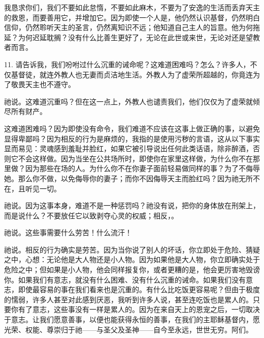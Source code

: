 我恳求你们，我们不要如此怠惰，不要如此麻木，不要为了安逸的生活而丢弃天主的救恩，而要善用它，并增加它。因为即使一个人是，他仍然认识基督，仍然明白信仰，仍然聆听天主的圣言，仍然离知识不远；他知道自己主人的旨意。他为何拖延？为何迟延耽搁？没有什么比善生更好了，无论在此世或来世，无论对还是望教者而言。\par

11. 请告诉我，我们吩咐过什么沉重的诫命呢？这难道困难吗？怎么？许多人，不仅基督徒，就连外教人也无妻而贞洁地生活。外教人为了虚荣所超越的，你竟连为了敬畏天主也不遵守。\par

祂说。这难道沉重吗？但在这一点上，外教人也谴责我们，他们仅仅为了虚荣就倾尽所有财产。\par

这难道困难吗？因为即使没有命令，我们难道不应该在这事上做正确的事，以避免显得卑鄙吗？因为相反的行为是麻烦的，我指的是使用污秽的言语，这从以下事实显而易见：灵魂感到羞耻并脸红，如果它被引导说出任何此类话语，除非醉酒，否则它不会这样做。因为当坐在公共场所时，即使你在家里这样做，为什么你不在那里做？因为那些在场的人。为什么你不在你妻子面前轻易做同样的事？为了不侮辱她。那么你不做，以免侮辱你的妻子；而你不因侮辱天主而脸红吗？因为祂无所不在，且听见一切。\par

祂说。因为这事本身，难道不是一种惩罚吗？祂没有说，把你的身体放在刑架上，而是说什么？不要放任它以致剥夺心灵的权威；相反，。\par

祂说。这些事需要什么劳苦！什么流汗！\par

祂说。相反的行为确实是劳苦。因为当你说了别人的坏话，你立即处于危险、猜疑之中，心想：无论他是大人物还是小人物。因为如果他是大人物，你立即确实处于危险之中；但如果是小人物，他会同样报复你，或者更糟的是，他会更厉害地毁谤你。如果我们有意志，就没有什么困难、没有什么沉重的诫命。如果我们没有意志，即使最容易的事在我们看来也是沉重的。有什么比吃饭更容易呢？但由于极度的懦弱，许多人甚至对此感到厌恶，我听到许多人说，甚至连吃饭也是累人的。只要你有了意志，这些事没有一样是累人的。因为在来自天上的恩宠之后，一切取决于意志。让我们愿意善事，以便也能获得永恒的善事，在我们的主耶稣基督内，愿光荣、权能、尊崇归于祂——与圣父及圣神——自今至永远，世世无穷。阿们。\par

